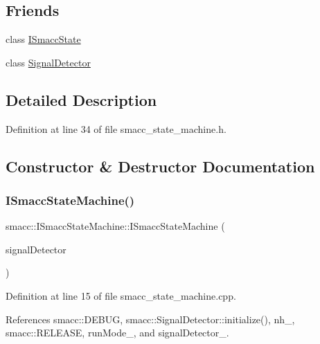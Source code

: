\subsection*{Friends}
\begin{DoxyCompactItemize}
\item 
class \hyperlink{classsmacc_1_1ISmaccStateMachine_ab907e4cdbf326246355f56640780162e}{I\+Smacc\+State}
\item 
class \hyperlink{classsmacc_1_1ISmaccStateMachine_a9fb9044f83e768849d1b42d9d0d5508e}{Signal\+Detector}
\end{DoxyCompactItemize}


\subsection{Detailed Description}


Definition at line 34 of file smacc\+\_\+state\+\_\+machine.\+h.



\subsection{Constructor \& Destructor Documentation}
\mbox{\label{classsmacc_1_1ISmaccStateMachine_a497c2185584adbec3298d4000277b75e}} 
\subsubsection{\texorpdfstring{I\+Smacc\+State\+Machine()}{ISmaccStateMachine()}}
{\footnotesize\ttfamily smacc\+::\+I\+Smacc\+State\+Machine\+::\+I\+Smacc\+State\+Machine (\begin{DoxyParamCaption}\item[{\hyperlink{classsmacc_1_1SignalDetector}{Signal\+Detector} $\ast$}]{signal\+Detector }\end{DoxyParamCaption})}



Definition at line 15 of file smacc\+\_\+state\+\_\+machine.\+cpp.



References smacc\+::\+D\+E\+B\+UG, smacc\+::\+Signal\+Detector\+::initialize(), nh\+\_\+, smacc\+::\+R\+E\+L\+E\+A\+SE, run\+Mode\+\_\+, and signal\+Detector\+\_\+.


